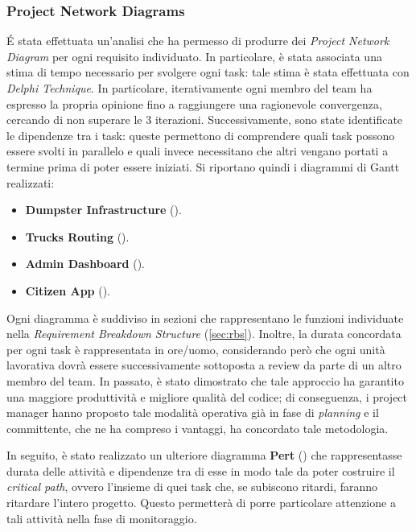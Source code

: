 \subsubsection{Project Network Diagrams}
\'E stata effettuata un'analisi che ha permesso di produrre dei \textit{Project Network Diagram} per ogni requisito individuato.
In particolare, è stata associata una stima di tempo necessario per svolgere ogni task: tale stima è stata effettuata con \textit{Delphi Technique}.
In particolare, iterativamente ogni membro del team ha espresso la propria opinione fino a raggiungere una ragionevole convergenza, cercando di non superare le 3 iterazioni.
Successivamente, sono state identificate le dipendenze tra i task: queste permettono di comprendere quali task possono essere svolti in parallelo e quali invece necessitano che altri vengano portati a termine prima di poter essere iniziati.
Si riportano quindi i diagrammi di Gantt realizzati:
\begin{itemize}
    \item \textbf{Dumpster Infrastructure} ().
    \item \textbf{Trucks Routing} ().
    \item \textbf{Admin Dashboard} ().
    \item \textbf{Citizen App} ().
\end{itemize}
Ogni diagramma è suddiviso in sezioni che rappresentano le funzioni individuate nella \textit{Requirement Breakdown Structure} (\ref{sec:rbs}).
Inoltre, la durata concordata per ogni task è rappresentata in ore/uomo, considerando però che ogni unità lavorativa dovrà essere successivamente sottoposta a review da parte di un altro membro del team.
In passato, è stato dimostrato che tale approccio ha garantito una maggiore produttività e migliore qualità del codice; di conseguenza, i project manager hanno proposto tale modalità operativa già in fase di \textit{planning} e il committente, che ne ha compreso i vantaggi, ha concordato tale metodologia.

In seguito, è stato realizzato un ulteriore diagramma \textbf{Pert} () che rappresentasse durata delle attività e dipendenze tra di esse in modo tale da poter costruire il \textit{critical path}, ovvero l'insieme di quei task che, se subiscono ritardi, faranno ritardare l'intero progetto. Questo permetterà di porre particolare attenzione a tali attività nella fase di monitoraggio.

